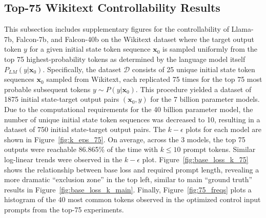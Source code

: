 \documentclass{article} %
\begin{document}
\subsection{Top-75 Wikitext Controllability Results} 
\label{sec:sup_75}
This subsection includes supplementary figures for the controllability of Llama-7b, Falcon-7b, and Falcon-40b on the Wikitext dataset where the target output token $y$ for a given initial state token sequence $\mathbf x_0$ is sampled uniformly from the top 75 highest-probability tokens as determined by the language model itself $P_{LM}(y | \mathbf x_0)$. 
Specifically, the dataset $\mathcal D$ consists of 25 unique initial state token sequences $\mathbf x_0$ sampled from Wikitext, each replicated 75 times for the top 75 most probable subsequent tokens $y \sim P(y | \mathbf x_0)$. 
This procedure yielded a dataset of 1875 initial state-target output pairs $(\mathbf x_0, y)$ for the 7 billion parameter models.
Due to the computational requirements for the 40 billion parameter model, the number of unique initial state token sequences was decreased to 10, resulting in a dataset of 750 initial state-target output pairs. 
The $k-\epsilon$ plots for each model are shown in Figure~\ref{fig:k_eps_75}. On average, across the 3 models, the top 75 outputs were reachable 86.865\% of the time with $k\leq 10$ prompt tokens. 
Similar log-linear trends were observed in the $k-\epsilon$ plot.
Figure~\ref{fig:base_loss_k_75} shows the relationship between base loss and required prompt length, revealing a more dramatic ``exclusion zone'' in the top left, similar to main ``ground truth'' results in Figure~\ref{fig:base_loss_k_main}.
Finally, Figure~\ref{fig:75_freqs} plots a histogram of the 40 most common tokens observed in the optimized control input prompts from the top-75 experiments. 
\end{document}
